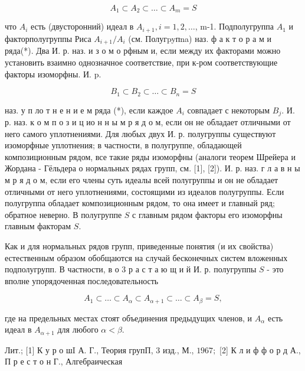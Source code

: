 \documentclass[10pt]{article}
\begin{document}
\[

A_{1} \subset A_{2} \subset \ldots \subset A_{m}=S

\]



что $A_{i}$ есть (двусторонний) идеал в $A_{i+1}, i=1,2, \ldots$, m-1. Подполугруппа $A_{1}$ и факторполугруппы Риса $A_{i+1} / A_{i}$ (см. Полугpyпna) наз. ф а к т о р а м и ряда(*). Два И. р. наз. и з о м о рфным и, если между их факторами можно установить взаимно однозначное соответствие, при к-ром соответствующие факторы изоморфны. И. p.



\[

B_{1} \subset B_{2} \subset \ldots \subset B_{n}=S

\]



наз. у п ло т н е н и е м ряда (*), если каждое $A_{i}$ совпадает с некоторым $B_{j}$. И. р. наз. к о м п о з и ц ио н н ы м р я д о м, если он не обладает отличными от него самого уплотнениями. Для любых двух И. р. полугруппы существуют изоморфные уплотнения; в частности, в полугруппе, обладающей композиционным рядом, все такие ряды изоморфны (аналоги теорем Шрейера и Жордана - Гёльдера о нормальных рядах групп, см. [1], [2]). И. р. наз. г л а в н ы м р я д о м, если его члены суть идеалы всей полугруппы и он не обладает отличными от него уплотнениями, состоящими из идеалов полугруппы. Если полугруппа обладает композиционным рядом, то она имеет и главный ряд; обратное неверно. В полугруппе $S$ с главным рядом факторы его изоморфны главным факторам $S$.



Как и для нормальных рядов групп, приведенные понятия (и их свойства) естественным образом обобщаются на случай бесконечных систем вложенных подполугрупп. В частности, в о 3 р а с т а ю щ и й И. р. полугруппы $S$ - это вполне упорядоченная последовательность



\[

A_{1} \subset \ldots \subset A_{\alpha} \subset A_{\alpha+1} \subset \ldots \subset A_{\beta}=S,

\]



где на предельных местах стоят объединения предыдущих членов, и $A_{\alpha}$ есть идеал в $A_{\alpha+1}$ для любого $\alpha<\beta$.



Лит.; [1] К у р о шI А. Г., Теория групП, 3 изд., М., $1967 ;$ [2] К л и ф ф о р д А., П р е с т о н Г., Алгебраическая
\end{document}
